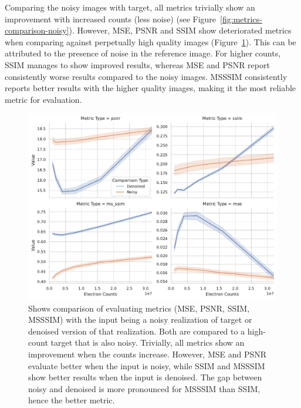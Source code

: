 Comparing the noisy images with target, all metrics trivially show an improvement with increased counts (less noise) (see Figure~\ref{fig:metrics-comparison-noisy}). However, \gls{MSE}, \gls{PSNR} and \gls{SSIM} show deteriorated metrics when comparing against perpetually high quality images (Figure~\ref{fig:metrics-comparison}). This can be attributed to the presence of noise in the reference image. For higher counts, \gls{SSIM} manages to show improved results, whereas \gls{MSE} and \gls{PSNR} report consistently worse results compared to the noisy images. \gls{MSSSIM} consistently reports better results with the higher quality images, making it the most reliable metric for evaluation.

\begin{figure}
    \centering
    \includegraphics[width=0.7\linewidth]{images/metrics_comparison_denoised_noisy.pdf}
    \caption{Shows comparison of evaluating metrics (\gls{MSE}, \gls{PSNR}, \gls{SSIM}, \gls{MSSSIM}) with the input being a noisy realization of target or denoised version of that realization. Both are compared to a high-count target that is also noisy. Trivially, all metrics show an improvement when the counts increase. However, \gls{MSE} and \gls{PSNR} evaluate better when the input is noisy, while \gls{SSIM} and \gls{MSSSIM} show better results when the input is denoised. The gap between noisy and denoised is more pronounced for \gls{MSSSIM} than \gls{SSIM}, hence the better metric. }
   \label{fig:metrics-comparison}
\end{figure}

